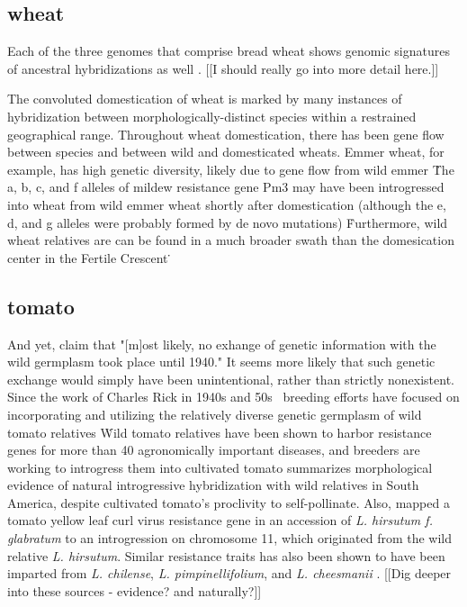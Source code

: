 \documentclass[11pt]{article}
\begin{document}
\subsection*{wheat}

Each of the three genomes that comprise bread wheat shows genomic signatures of ancestral hybridizations as well \cite{marcussen2014ancient}.
[[I should really go into more detail here.]]

The convoluted domestication of wheat is marked by many instances of hybridization between morphologically-distinct species within a restrained geographical range.
Throughout wheat domestication, there has been gene flow between species and between wild and domesticated wheats.
Emmer wheat, for example, has high genetic diversity, likely due to gene flow from wild emmer \cite{luo2007structure, dvorak2006molecular}\.
The a, b, c, and f alleles of mildew resistance gene Pm3 may have been introgressed into wheat from wild emmer wheat shortly after domestication (although the e, d, and g alleles were probably formed by de novo mutations) \cite{TPJ:TPJ2772}\.
Furthermore, wild wheat relatives are can be found in a much broader swath than the domesication center in the Fertile Crescent \cite{CWR}\.




\subsection*{tomato}

And yet, \cite{bai2007domestication} claim that "[m]ost likely, no exhange of genetic information with the wild germplasm took place until 1940."
It seems more likely that such genetic exchange would simply have been unintentional, rather than strictly nonexistent.
Since the work of Charles Rick in 1940s and 50s \cite{rick1953novel}\, breeding efforts have focused on incorporating and utilizing the relatively diverse genetic germplasm of wild tomato relatives \cite{rick1988tomato, miller1990rflp, rick1982potential}\.
Wild tomato relatives have been shown to harbor resistance genes for more than 40 agronomically important diseases, and breeders are working to introgress them into cultivated tomato \cite{rick1995utilization}\.
\cite{rick1958role} summarizes morphological evidence of natural introgressive hybridization with wild relatives in South America, despite cultivated tomato's proclivity to self-pollinate.
Also, \cite{hanson2000mapping} mapped a tomato yellow leaf curl virus resistance gene in an accession of \emph{L. hirsutum f. glabratum} \cite{banerjee1990transfer} to an introgression on chromosome 11, which originated from the wild relative \emph{L. hirsutum}.
Similar resistance traits has also been shown to have been imparted from \emph{L. chilense}, \emph{L. pimpinellifolium}, and \emph{L. cheesmanii} \cite{hanson2000mapping}.
[[Dig deeper into these sources - evidence?  and naturally?]]
\end{document}
